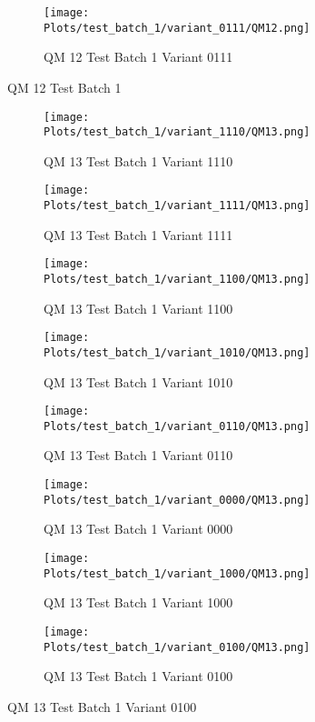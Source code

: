 \documentclass{DissertateFigs}
\begin{document}
\begin{figure}[t!]
\medskip

    \begin{subfigure}{0.47\textwidth}
    \texttt{[image: Plots/test\_batch\_1/variant\_0111/QM12.png]}
    \caption{QM 12 Test Batch 1 Variant 0111}
    \end{subfigure}
\caption{QM 12 Test Batch 1}
    \end{figure}
\clearpage
\begin{figure}[t!]
    \begin{subfigure}{0.47\textwidth}
    \texttt{[image: Plots/test\_batch\_1/variant\_1110/QM13.png]}
    \caption{QM 13 Test Batch 1 Variant 1110}
    \end{subfigure}
    \begin{subfigure}{0.47\textwidth}
    \texttt{[image: Plots/test\_batch\_1/variant\_1111/QM13.png]}
    \caption{QM 13 Test Batch 1 Variant 1111}
    \end{subfigure}

\medskip

    \begin{subfigure}{0.47\textwidth}
    \texttt{[image: Plots/test\_batch\_1/variant\_1100/QM13.png]}
    \caption{QM 13 Test Batch 1 Variant 1100}
    \end{subfigure}
    \begin{subfigure}{0.47\textwidth}
    \texttt{[image: Plots/test\_batch\_1/variant\_1010/QM13.png]}
    \caption{QM 13 Test Batch 1 Variant 1010}
    \end{subfigure}

\medskip

    \begin{subfigure}{0.47\textwidth}
    \texttt{[image: Plots/test\_batch\_1/variant\_0110/QM13.png]}
    \caption{QM 13 Test Batch 1 Variant 0110}
    \end{subfigure}
    \begin{subfigure}{0.47\textwidth}
    \texttt{[image: Plots/test\_batch\_1/variant\_0000/QM13.png]}
    \caption{QM 13 Test Batch 1 Variant 0000}
    \end{subfigure}

\medskip

    \begin{subfigure}{0.47\textwidth}
    \texttt{[image: Plots/test\_batch\_1/variant\_1000/QM13.png]}
    \caption{QM 13 Test Batch 1 Variant 1000}
    \end{subfigure}
    \begin{subfigure}{0.47\textwidth}
    \texttt{[image: Plots/test\_batch\_1/variant\_0100/QM13.png]}
    \caption{QM 13 Test Batch 1 Variant 0100}
    \end{subfigure}


\end{figure}
\end{document}
